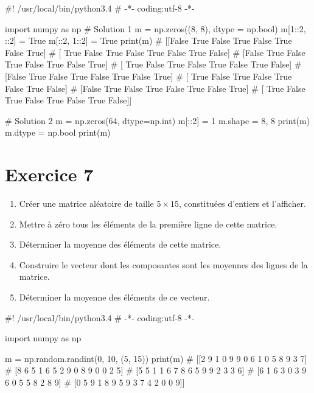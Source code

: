\documentclass[10pt,fleqn]{article} %
\begin{document}
\begin{multicols}{2}
\ifprof 
\begin{corrige}
\begin{python}
#! /usr/local/bin/python3.4
# -*- coding:utf-8 -*-
    
import numpy as np
# Solution 1
m = np.zeros((8, 8), dtype = np.bool)
m[1::2, ::2] = True
m[::2, 1::2] = True
print(m)
# [[False  True False  True False  True False  True]
#  [ True False  True False  True False  True False]
#  [False  True False  True False  True False  True]
#  [ True False  True False  True False  True False]
#  [False  True False  True False  True False  True]
#  [ True False  True False  True False  True False]
#  [False  True False  True False  True False  True]
#  [ True False  True False  True False  True False]]


# Solution 2
m = np.zeros(64, dtype=np.int)
m[::2] = 1
m.shape = 8, 8
print(m)
m.dtype = np.bool
print(m)
\end{python}
\end{corrige}
\else
\fi

\section*{Exercice 7}
\begin{enumerate}
\item 
  Créer une matrice aléatoire de taille $5\times 15$, constituées d'entiers et
  l'afficher.

\item
  Mettre à zéro tous les éléments de la première ligne de cette matrice.

\item
  Déterminer la moyenne des éléments de cette matrice. 
\item
  Construire le vecteur
  dont les composantes sont les moyennes des lignes de la matrice.
\item
  Déterminer la moyenne des éléments de ce vecteur.
\end{enumerate}

\ifprof 
\begin{corrige}
\begin{python}
#! /usr/local/bin/python3.4
# -*- coding:utf-8 -*-
    
import numpy as np

m = np.random.randint(0, 10, (5, 15))
print(m)
# [[2 9 1 0 9 9 0 6 1 0 5 8 9 3 7]
#  [8 6 5 1 6 5 2 9 0 8 9 0 0 2 5]
#  [5 5 1 1 6 7 8 6 5 9 9 2 3 3 6]
#  [6 1 6 3 0 3 9 6 0 5 5 8 2 8 9]
#  [0 5 9 1 8 9 5 9 3 7 4 2 0 0 9]]


\end{python}
\end{corrige}
\end{multicols}
\end{document}

